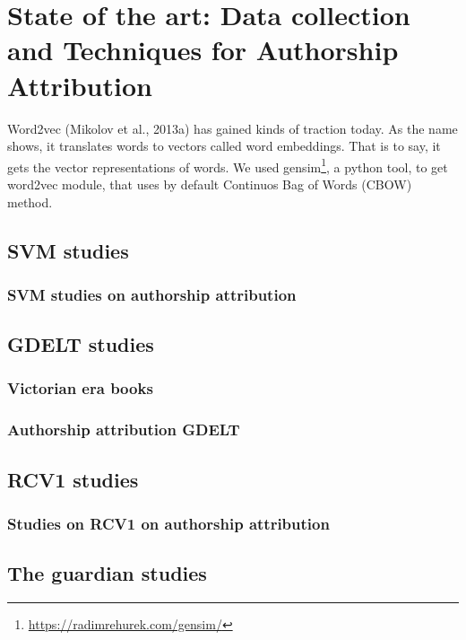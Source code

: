 \chapter{State of the art: Data collection and Techniques for Authorship Attribution}

Word2vec (Mikolov et al., 2013a) has gained kinds of traction today. As the name shows, it translates words to vectors called word embeddings. That is to say, it gets the vector representations of words. We used gensim\footnote{\url{https://radimrehurek.com/gensim/}}, a python tool, to get word2vec module, that uses by default Continuos Bag of Words (CBOW) method.

\section{SVM studies}

\subsection{SVM studies on authorship attribution}

\section{GDELT studies}

\subsection{Victorian era books}

\subsection{Authorship attribution GDELT}

\section{RCV1 studies}

\subsection{Studies on RCV1 on authorship attribution}

\section{The guardian studies}

